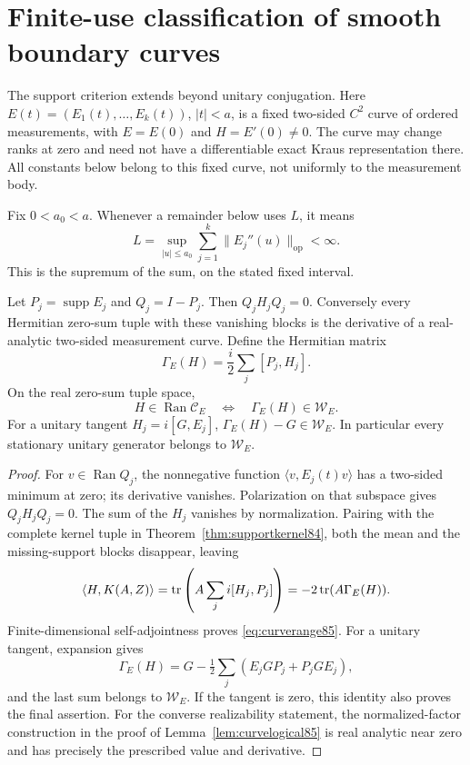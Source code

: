 \section{Finite-use classification of smooth boundary curves}
\label{sec:curves85}
The support criterion extends beyond unitary conjugation.  Here
$E(t)=(E_1(t),\ldots,E_k(t))$, $|t|<a$, is a fixed two-sided
$C^2$ curve of ordered measurements, with $E=E(0)$ and
$H=E'(0)\ne0$.  The curve may change ranks at zero and need not
have a differentiable exact Kraus representation there.  All constants
below belong to this fixed curve, not uniformly to the measurement body.

Fix $0<a_0<a$.  Whenever a remainder below uses $L$, it means
\begin{equation}\label{eq:curvature86}
 L=\sup_{|u|\le a_0}\sum_{j=1}^k\|E_j''(u)\|_{\mathrm{op}}<\infty.
\end{equation}
This is the supremum of the sum, on the stated fixed interval.

\begin{lemma}
\label{lem:curvegenerator85}
Let $P_j=\operatorname{supp}E_j$ and $Q_j=I-P_j$.  Then
$Q_jH_jQ_j=0$.  Conversely every Hermitian zero-sum tuple with these
vanishing blocks is the derivative of a real-analytic two-sided
measurement curve.  Define the Hermitian matrix
\begin{equation}\label{eq:curvegenerator85}
 \Gamma_E(H)=\frac i2\sum_j[P_j,H_j].
\end{equation}
On the real zero-sum tuple space,
\begin{equation}\label{eq:curverange85}
 H\in\operatorname{Ran}\mathcal C_E
 \quad\Longleftrightarrow\quad \Gamma_E(H)\in\mathcal W_E.
\end{equation}
For a unitary tangent $H_j=i[G,E_j]$,
$\Gamma_E(H)-G\in\mathcal W_E$.  In particular every stationary
unitary generator belongs to $\mathcal W_E$.
\end{lemma}
\begin{proof}
For $v\in\operatorname{Ran}Q_j$, the nonnegative function
$\langle v,E_j(t)v\rangle$ has a two-sided minimum at zero;
its derivative vanishes.  Polarization on that subspace gives
$Q_jH_jQ_j=0$.  The sum of the $H_j$ vanishes by normalization.
Pairing with the complete kernel tuple in
Theorem~\ref{thm:supportkernel84}, both the mean and the
missing-support blocks disappear, leaving
\[
 \langle H,K(A,Z)\rangle
 =\operatorname{tr}\left(A\sum_ji[H_j,P_j]\right)
 =-2\operatorname{tr}(A\Gamma_E(H)).
\]
Finite-dimensional self-adjointness proves \eqref{eq:curverange85}.
For a unitary tangent, expansion gives
\[
 \Gamma_E(H)=G-\tfrac12\sum_j(E_jGP_j+P_jGE_j),
\]
and the last sum belongs to $\mathcal W_E$.  If the tangent is zero,
this identity also proves the final assertion.  For the converse
realizability statement, the normalized-factor construction in the
proof of Lemma~\ref{lem:curvelogical85} is real analytic near zero
and has precisely the prescribed value and derivative.
\end{proof}

